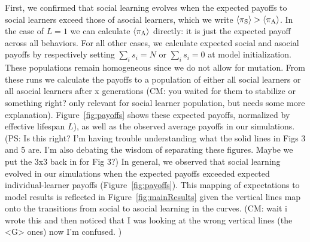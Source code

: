 \documentclass[letterpaper,11.5pt]{scrartcl}
\newcommand{\cm}[1]{{\textcolor{mypurple} {({\tiny CM:} #1)}}}
\newcommand{\ps}[1]{{\textcolor{mygreen} {({\tiny PS:} #1)}}}
\begin{document}
First, we confirmed that social learning evolves when the expected payoffs to social
learners exceed those of asocial learners, which we write $\langle \pi_\mathrm{S} \rangle > \langle \pi_\mathrm{A} \rangle$.
In the case of $L=1$ we can calculate $\langle \pi_\mathrm{A} \rangle$ directly: it is just the expected
payoff across all behaviors. For all other cases, we calculate expected social and asocial payoffs by respectively setting
$\sum_i s_i = N$ or $\sum_i s_i = 0$ at model initialization. These populations remain homogeneous since we do not allow for mutation. From these runs we calculate the payoffs to a population of either all social learners or all asocial learners after x generations \cm{you waited for them to stabilize or something right? only relevant for social learner population, but needs some more explanation}.  Figure~\ref{fig:payoffs} shows these expected payoffs, normalized by effective lifespan $L$), as well as the observed average payoffs in our simulations. \ps{Is this right? I'm having trouble understanding what the solid lines in Figs 3 and 5 are. I'm also debating the wisdom of separating these figures. Maybe we put the 3x3 back in for Fig 3?}
In general, we observed that social learning evolved in our simulations when the expected payoffs exceeded expected individual-learner
payoffs (Figure~\ref{fig:payoffs}). This mapping of expectations to model results is reflected in Figure~\ref{fig:mainResults} given the vertical lines map onto the transitions from social to asocial learning in the curves. \cm{wait i wrote this and then noticed that I was looking at the wrong vertical lines (the <G> ones) now I'm confused. }

\end{document}
